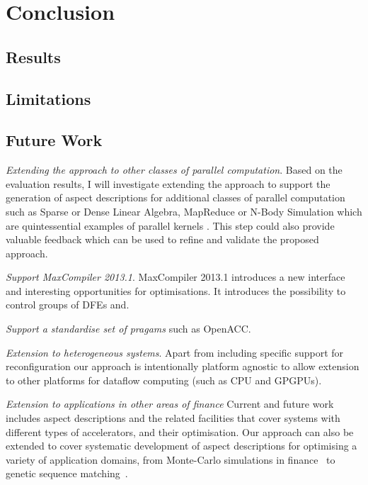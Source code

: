 \chapter{Conclusion}

\section{Results}

\section{Limitations}

\section{Future Work}

\emph{Extending the approach to other classes of parallel
  computation}.  Based on the evaluation results, I will investigate
extending the approach to support the generation of aspect
descriptions for additional classes of parallel computation such as
Sparse or Dense Linear Algebra, MapReduce or N-Body Simulation which
are quintessential examples of parallel kernels
\cite{Asanovic:Bodik:Catanzaro:Gebis:Husbands:Keutzer:Patterson:Plishker:Shalf:Williams:Yelick:2006}. This
step could also provide valuable feedback which can be used to refine
and validate the proposed approach.

\emph{Support MaxCompiler 2013.1}. MaxCompiler 2013.1 introduces a new
interface and interesting opportunities for optimisations. It
introduces the possibility to control groups of DFEs and.

\emph{Support a standardise set of pragams} such as OpenACC.

\emph{Extension to heterogeneous systems}. Apart from including
specific support for reconfiguration our approach is intentionally
platform agnostic to allow extension to other platforms for dataflow
computing (such as CPU and GPGPUs).

\emph{Extension to applications in other areas of finance}
Current and future work includes aspect descriptions and the related
facilities that cover systems with different types of accelerators,
and their optimisation. Our approach can also be extended to cover
systematic development of aspect descriptions for optimising a variety
of application domains, from Monte-Carlo simulations in
finance~\cite{Jin:2012} to genetic sequence
matching~\cite{Arram:2013}.
